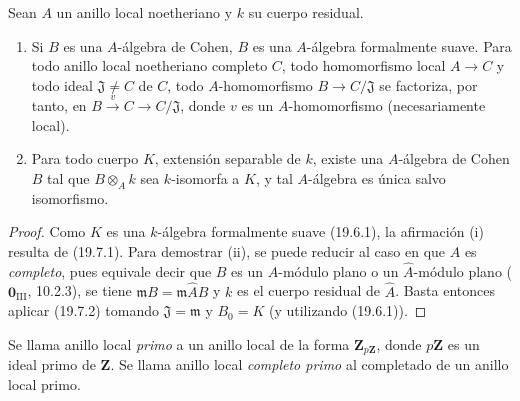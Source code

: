 
\begin{theorem}[19.8.2]
\label{0.19.8.2-fr}
Sean $A$ un anillo local noetheriano y $k$ su cuerpo residual.
\begin{enumerate}
  \item[(i)] Si $B$ es una $A$-álgebra de Cohen, $B$ es una $A$-álgebra
  formalmente suave. Para todo anillo local noetheriano completo $C$, todo
  homomorfismo local $A\to C$ y todo ideal $\mathfrak J\neq C$ de $C$,
  todo $A$-homomorfismo $B\to C/\mathfrak J$ se factoriza, por tanto, en
  $B\xrightarrow{v}C\to C/\mathfrak J$, donde $v$ es un $A$-homomorfismo
  (necesariamente local).
  \item[(ii)] Para todo cuerpo $K$, extensión separable de $k$, existe una
  $A$-álgebra de Cohen $B$ tal que $B\otimes_A k$ sea $k$-isomorfa a $K$,
  y tal $A$-álgebra es única salvo isomorfismo.
\end{enumerate}
\end{theorem}

\begin{proof}
Como $K$ es una $k$-álgebra formalmente suave (19.6.1), la afirmación (i)
resulta de (19.7.1). Para demostrar (ii), se puede reducir al caso en que $A$ es
\emph{completo}, pues equivale decir que $B$ es un $A$-módulo plano
o un $\widehat A$-módulo plano ($\mathbf 0_{\mathrm{III}}$, 10.2.3), se tiene
$\mathfrak mB=\mathfrak m\widehat AB$ y $k$ es el cuerpo residual de
$\widehat A$. Basta entonces aplicar (19.7.2) tomando
$\mathfrak J=\mathfrak m$ y $B_0=K$ (y utilizando (19.6.1)).
\end{proof}

\begin{definition}[19.8.3]
\label{0.19.8.3-fr}
Se llama anillo local \emph{primo} a un anillo local de la forma
$\mathbf Z_{p\mathbf Z}$, donde $p\mathbf Z$ es un ideal primo de $\mathbf Z$.
Se llama anillo local \emph{completo primo} al completado de un anillo local
primo.
\end{definition}

